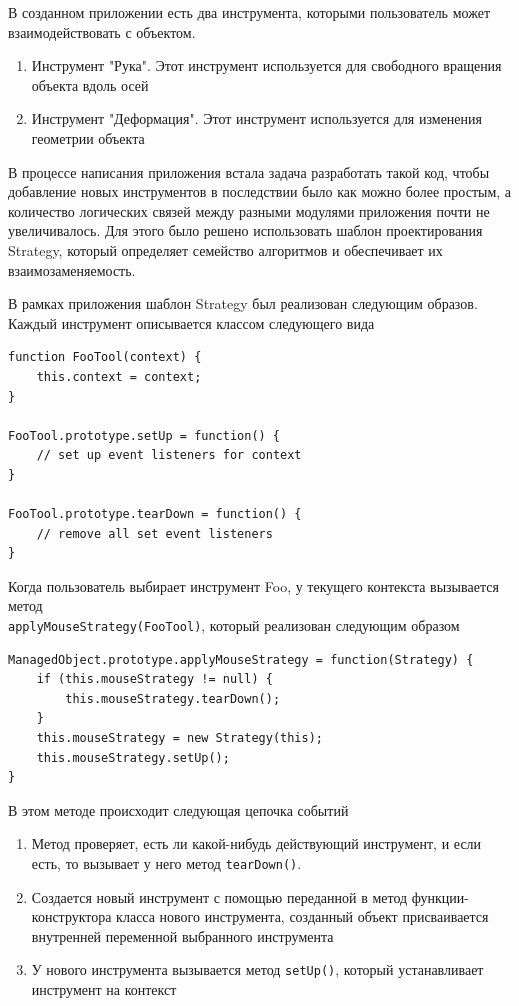 \documentclass[14pt, a4paper]{extarticle}
\begin{document}
В созданном приложении есть два инструмента, которыми пользователь может
взаимодействовать с объектом.
\begin{enumerate}
    \item Инструмент "Рука". Этот инструмент используется для свободного
    вращения объекта вдоль осей
    \item Инструмент "Деформация". Этот инструмент используется для изменения
    геометрии объекта
\end{enumerate}
В процессе написания приложения встала задача разработать такой код, чтобы
добавление новых инструментов в последствии было как можно более простым, а
количество логических связей между разными модулями приложения почти не
увеличивалось. Для этого было решено использовать шаблон проектирования
Strategy, который определяет семейство алгоритмов и обеспечивает их
взаимозаменяемость.

В рамках приложения шаблон Strategy был реализован следующим образов. Каждый
инструмент описывается классом следующего вида
\begin{lstlisting}
function FooTool(context) {
    this.context = context;
}

FooTool.prototype.setUp = function() {
    // set up event listeners for context
}

FooTool.prototype.tearDown = function() {
    // remove all set event listeners
}
\end{lstlisting}

Когда пользователь выбирает инструмент Foo, у текущего контекста вызывается метод \\
\texttt{applyMouseStrategy(FooTool)}, который реализован следующим образом
\begin{lstlisting}
ManagedObject.prototype.applyMouseStrategy = function(Strategy) {
    if (this.mouseStrategy != null) {
        this.mouseStrategy.tearDown();
    }
    this.mouseStrategy = new Strategy(this);
    this.mouseStrategy.setUp();
}
\end{lstlisting}

В этом методе происходит следующая цепочка событий
\begin{enumerate}
    \item Метод проверяет, есть ли какой-нибудь действующий инструмент, и если
    есть, то вызывает у него метод \texttt{tearDown()}.
    \item Создается новый инструмент с помощью переданной в метод
    функции-конструктора класса нового инструмента, созданный объект
    присваивается внутренней переменной выбранного инструмента
    \item У нового инструмента вызывается метод \texttt{setUp()}, который
    устанавливает инструмент на контекст
\end{enumerate}
\end{document}
